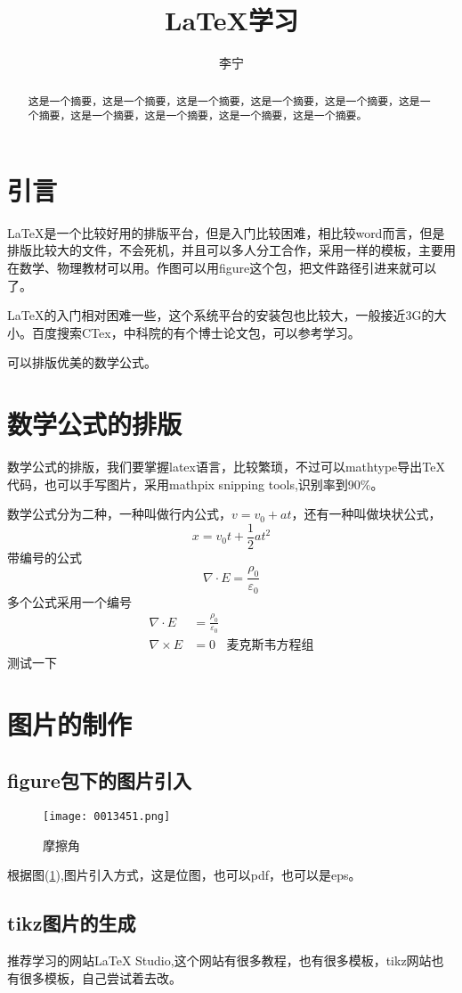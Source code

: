 \documentclass[utf8,a4paper,12pt]{ctexart}
\title{\LaTeX 学习}
\author{李宁}
\date{}
\begin{document}
    \maketitle
    \tableofcontents
    \begin{abstract}
        这是一个摘要，这是一个摘要，这是一个摘要，这是一个摘要，这是一个摘要，这是一个摘要，这是一个摘要，这是一个摘要，这是一个摘要，这是一个摘要。
    \end{abstract}
    \section{引言}
    \LaTeX 是一个比较好用的排版平台，但是入门比较困难，相比较word而言，但是排版比较大的文件，不会死机，并且可以多人分工合作，采用一样的模板，主要用在数学、物理教材可以用。作图可以用figure这个包，把文件路径引进来就可以了。

    \LaTeX 的入门相对困难一些，这个系统平台的安装包也比较大，一般接近3G的大小。百度搜索CTex，中科院的有个博士论文包，可以参考学习。

    可以排版优美的数学公式。
    \section{数学公式的排版}
    数学公式的排版，我们要掌握latex语言，比较繁琐，不过可以mathtype导出TeX代码，也可以手写图片，采用mathpix snipping tools,识别率到90\%。

    数学公式分为二种，一种叫做行内公式，$v=v_0+at$，还有一种叫做块状公式，
    \[
        x=v_0 t+\frac{1}{2} at^2   
    \]
    带编号的公式
    \begin{equation}%
        \nabla \cdot E =\frac{\rho_0}{\varepsilon_0}
    \end{equation}
    多个公式采用一个编号
    \begin{equation}
        \begin{split}
            \nabla \cdot E &=\frac{\rho_0}{\varepsilon_0}\\
            \nabla \times E&=0  ~~~~    \text{麦克斯韦方程组}
        \end{split}
    \end{equation}
    测试一下
    \section{图片的制作}
    \subsection{figure包下的图片引入}
    \begin{figure}
        \centering
        \texttt{[image: 0013451.png]}
        \caption{摩擦角}
        \label{fraction}
    \end{figure}
    根据图(\ref{fraction}),图片引入方式，这是位图，也可以pdf，也可以是eps。
    \subsection{tikz图片的生成}
    推荐学习的网站LaTeX Studio,这个网站有很多教程，也有很多模板，tikz网站也有很多模板，自己尝试着去改。
\end{document}
